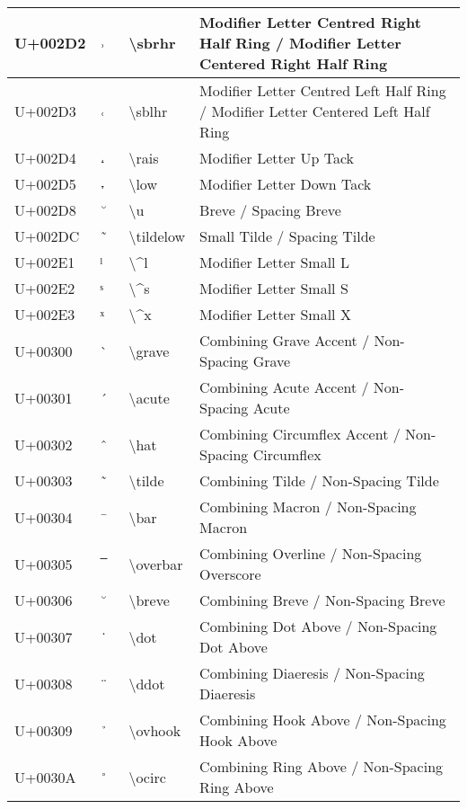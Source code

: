 \begin{table}[h]
\begin{tabulary}{\linewidth}{|L|L|L|L|}
\hline
U+002D2 & ˒ & {\textbackslash}sbrhr & Modifier Letter Centred Right Half Ring / Modifier Letter Centered Right Half Ring \\
\hline
U+002D3 & ˓ & {\textbackslash}sblhr & Modifier Letter Centred Left Half Ring / Modifier Letter Centered Left Half Ring \\
\hline
U+002D4 & ˔ & {\textbackslash}rais & Modifier Letter Up Tack \\
\hline
U+002D5 & ˕ & {\textbackslash}low & Modifier Letter Down Tack \\
\hline
U+002D8 & ˘ & {\textbackslash}u & Breve / Spacing Breve \\
\hline
U+002DC & ˜ & {\textbackslash}tildelow & Small Tilde / Spacing Tilde \\
\hline
U+002E1 & ˡ & {\textbackslash}{\textasciicircum}l & Modifier Letter Small L \\
\hline
U+002E2 & ˢ & {\textbackslash}{\textasciicircum}s & Modifier Letter Small S \\
\hline
U+002E3 & ˣ & {\textbackslash}{\textasciicircum}x & Modifier Letter Small X \\
\hline
U+00300 &  ̀  & {\textbackslash}grave & Combining Grave Accent / Non-Spacing Grave \\
\hline
U+00301 &  ́  & {\textbackslash}acute & Combining Acute Accent / Non-Spacing Acute \\
\hline
U+00302 &  ̂  & {\textbackslash}hat & Combining Circumflex Accent / Non-Spacing Circumflex \\
\hline
U+00303 &  ̃  & {\textbackslash}tilde & Combining Tilde / Non-Spacing Tilde \\
\hline
U+00304 &  ̄  & {\textbackslash}bar & Combining Macron / Non-Spacing Macron \\
\hline
U+00305 &  ̅  & {\textbackslash}overbar & Combining Overline / Non-Spacing Overscore \\
\hline
U+00306 &  ̆  & {\textbackslash}breve & Combining Breve / Non-Spacing Breve \\
\hline
U+00307 &  ̇  & {\textbackslash}dot & Combining Dot Above / Non-Spacing Dot Above \\
\hline
U+00308 &  ̈  & {\textbackslash}ddot & Combining Diaeresis / Non-Spacing Diaeresis \\
\hline
U+00309 &  ̉  & {\textbackslash}ovhook & Combining Hook Above / Non-Spacing Hook Above \\
\hline
U+0030A &  ̊  & {\textbackslash}ocirc & Combining Ring Above / Non-Spacing Ring Above \\

\end{tabulary}
\end{table}
